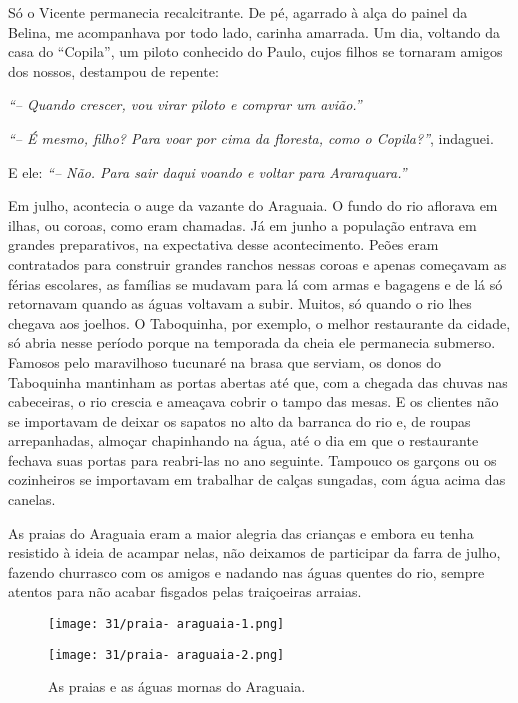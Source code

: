 Só o Vicente permanecia recalcitrante.
De pé, agarrado à alça do painel da Belina, me acompanhava por todo lado, carinha amarrada.
Um dia, voltando da casa do ``Copila'', um piloto conhecido do Paulo, cujos filhos se tornaram amigos dos nossos, destampou de repente:

\textit{``-- Quando crescer,  vou virar piloto e comprar um avião.''}

\textit{``-- É mesmo, filho? Para voar por cima da floresta, como o Copila?''}, indaguei.

E ele:
\textit{``-- Não.
Para sair daqui voando e voltar para Araraquara.''}

Em julho, acontecia o auge da vazante do Araguaia.
O fundo do rio aflorava em ilhas, ou coroas, como eram chamadas.
Já em junho a população entrava em grandes preparativos, na expectativa desse acontecimento.
Peões eram contratados para construir grandes ranchos nessas coroas e apenas começavam as férias escolares, as famílias se mudavam para lá com armas e bagagens e de lá só retornavam quando as águas voltavam a subir.
Muitos, só quando o rio lhes chegava aos joelhos.
O Taboquinha, por exemplo, o melhor restaurante da cidade, só abria nesse período porque na temporada da cheia ele permanecia submerso.
Famosos pelo maravilhoso tucunaré na brasa que serviam, os donos do Taboquinha mantinham as portas abertas até que, com a chegada das chuvas nas cabeceiras, o rio crescia e ameaçava cobrir o tampo das mesas.
E os clientes não se importavam de deixar os sapatos no alto da barranca do rio e, de roupas arrepanhadas, almoçar chapinhando na água, até o dia em que o restaurante fechava suas portas para reabri-las no ano seguinte.
Tampouco os garçons ou os cozinheiros se importavam em trabalhar de calças sungadas, com água acima das canelas.

As praias do Araguaia eram a maior alegria das crianças e embora eu tenha resistido à ideia de acampar nelas, não deixamos de participar da farra de julho, fazendo churrasco com os amigos e nadando nas águas quentes do rio, sempre atentos para não acabar fisgados pelas traiçoeiras arraias.

\begin{figure}
\centering
\texttt{[image: 31/praia- araguaia-1.png]}
\end{figure}

\begin{figure}\ContinuedFloat
\centering
\texttt{[image: 31/praia- araguaia-2.png]}
\caption{As praias e as águas mornas do Araguaia.}
\end{figure}

